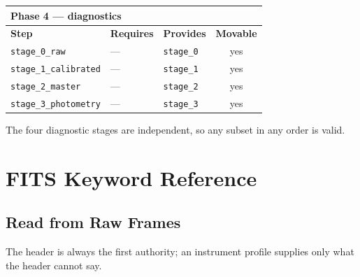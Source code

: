 \documentclass[11pt,a4paper]{article}
\begin{document}
\begin{center}
\begin{tabularx}{\textwidth}{|l|X|X|c|}
\hline
\multicolumn{4}{|l|}{\textbf{Phase 4 --- diagnostics}} \\
\hline
\textbf{Step} & \textbf{Requires} & \textbf{Provides} & \textbf{Movable} \\
\hline
\texttt{stage\_0\_raw} & --- & \texttt{stage\_0} & yes \\
\hline
\texttt{stage\_1\_calibrated} & --- & \texttt{stage\_1} & yes \\
\hline
\texttt{stage\_2\_master} & --- & \texttt{stage\_2} & yes \\
\hline
\texttt{stage\_3\_photometry} & --- & \texttt{stage\_3} & yes \\
\hline
\end{tabularx}
\end{center}

The four diagnostic stages are independent, so any subset in any order is valid.

\section{FITS Keyword Reference}

\subsection{Read from Raw Frames}
The header is always the first authority; an instrument profile supplies only
what the header cannot say.
\end{document}
